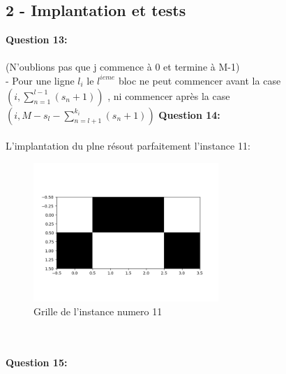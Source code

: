 \documentclass[a4paper]{memoir}
\begin{document}
\subsection{2 - Implantation et tests}
\textbf{Question 13: }\\\\
(N'oublions pas que j commence à 0 et termine à M-1)\\
- Pour une ligne $l_{i}$ le $l^{ieme}$ bloc ne peut commencer avant la case  $(i, \sum \limits_{{n=1}}^{l-1} (s_{n}+1))$ , ni commencer après la case $(i, M - s_{l} - \sum \limits_{{n = l+1}}^{k_{i}}(s_{n}+1))$
\newpage
\textbf{Question 14: }\\\\
L'implantation du plne résout parfaitement l'instance 11:
\begin{figure}[h]
\centering
  \includegraphics[width=7cm]{../images/plne_instance11.png}
  \caption{Grille de l'instance numero 11}
  \label{fig:plne11}
\end{figure}\\\\
\textbf{Question 15: }
\end{document}
